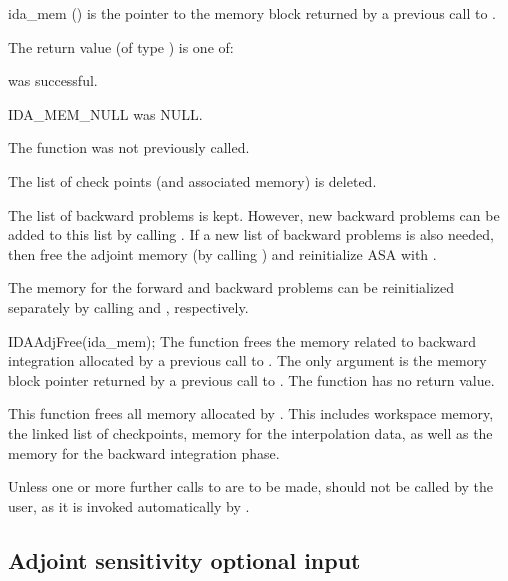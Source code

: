 {
  \begin{args}
  \item[ida\_mem] ()
    is the pointer to the {\idas} memory block returned by a previous call to
    .
  \end{args}
}
{
   The return value  (of type ) is one of:
   \begin{args}
   \item[\Id{IDA\_SUCCESS}] 
      was successful.
   \item[IDA\_MEM\_NULL] 
      was NULL.
   \item[\Id{IDA\_NO\_ADJ}]
     The function  was not previously called.
   \end{args}
}
{
  The list of check points (and associated memory) is deleted.

  The list of backward problems is kept. However, new backward problems can 
  be added to this list by calling . If a new list of backward
  problems is also needed, then free the adjoint memory (by calling
  ) and reinitialize ASA with .

  The {\idas} memory for the forward and backward problems can be reinitialized
  separately by calling  and , respectively.
}



{
  IDAAdjFree(ida\_mem);
}
{
  The function  frees the memory related to backward integration
  allocated by a previous call to .
}
{
  The only argument is the {\idas} memory block pointer returned by a previous call 
  to .
}
{
  The function  has no return value.
}
{
  This function frees all memory allocated by . This
  includes workspace memory, the linked list of checkpoints, memory
  for the interpolation data, as well as the {\idas} memory for the
  backward integration phase.

  Unless one or more further calls to  are to be made,
   should not be called by the user, as it is invoked
  automatically by .
}


\subsection{Adjoint sensitivity optional input}

